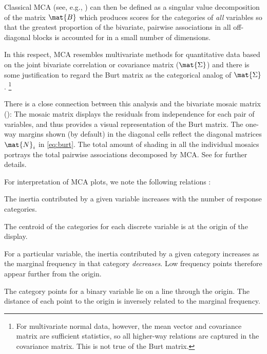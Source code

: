 \documentclass[11pt]{book}
\begin{document}
Classical MCA (see, e.g., \cite{Greenacre:84,GowerHand:96})
can then be defined as a singular value decomposition of the matrix $\mat{B}$ which produces scores for the
categories of \emph{all} variables so that the greatest proportion of the
bivariate, pairwise associations in all off-diagonal blocks is accounted for in
a small number of dimensions.

In this respect, MCA resembles multivariate methods for quantitative
data based on the joint bivariate correlation or covariance matrix
($\mat{\Sigma}$)
and there is some justification to regard the Burt matrix as the
categorical analog of $\mat{\Sigma}$.%
\footnote{For multivariate normal data, however, the mean vector and
covariance matrix are sufficient statistics, so all higher-way relations
are captured in the covariance matrix.  This is not true of the Burt
matrix.}

There is a close connection between this analysis and the bivariate mosaic
matrix ():
The mosaic matrix displays the residuals from independence for each
pair of variables, and thus provides a visual representation of the Burt matrix.
The one-way margins shown (by default) in the diagonal cells
reflect the diagonal matrices $\mat{N}_{i}$ in \eqref{eq:burt}.
The total amount of shading in all the individual mosaics
portrays the total pairwise associations decomposed by MCA.
See \citet{Friendly:99b} for further details.

For  interpretation of MCA plots, we note the following relations
\citep[\S 5.2]{Greenacre:84}:
\begin{itemize*}
\item The inertia contributed by a given variable increases with the
number of response categories.
\item The centroid of the categories for each discrete variable
is at the origin of the display.
\item For a particular variable,
the inertia contributed by a given category increases as the marginal
frequency in that category \emph{decreases}.
Low frequency points therefore appear further from the origin.
\item The category points for a binary variable lie on a line
through the origin.  The distance of each point to the origin is
inversely related to the marginal frequency.
\end{itemize*}
\end{document}
